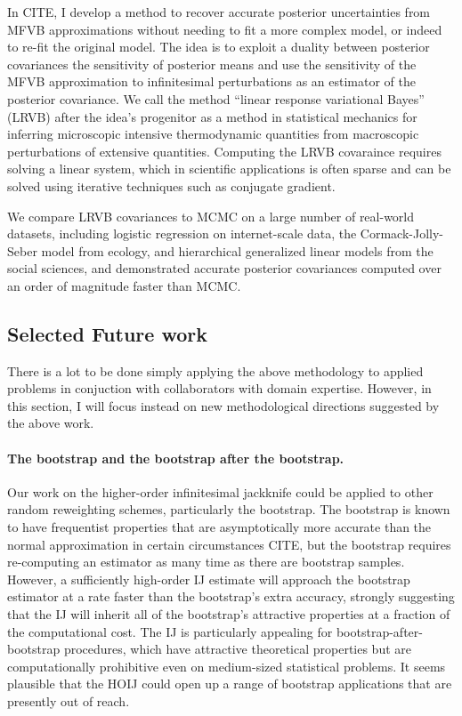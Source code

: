 In CITE, I develop a method to recover accurate posterior uncertainties from
MFVB approximations without needing to fit a more complex model, or indeed to
re-fit the original model.  The idea is to exploit a duality between posterior
covariances the sensitivity of posterior means and use the sensitivity of the
MFVB approximation to infinitesimal perturbations as an estimator of the
posterior covariance.  We call the method ``linear response variational Bayes''
(LRVB) after the idea's progenitor as a method in statistical mechanics for
inferring microscopic intensive thermodynamic quantities from macroscopic
perturbations of extensive quantities.  Computing the LRVB covaraince requires
solving a linear system, which in scientific applications is often sparse and
can be solved using iterative techniques such as conjugate gradient.

We compare LRVB covariances to MCMC on a large number of real-world datasets,
including logistic regression on internet-scale data, the Cormack-Jolly-Seber
model from ecology, and hierarchical generalized linear models from the
social sciences, and demonstrated accurate posterior covariances computed
over an order of magnitude faster than MCMC.


\subsection*{Selected Future work}

There is a lot to be done simply applying the above methodology to
applied problems in conjuction with collaborators with domain expertise.
However, in this section, I will focus instead on new methodological directions
suggested by the above work.

\paragraph{The bootstrap and the bootstrap after the bootstrap.}

Our work on the higher-order infinitesimal jackknife could be applied to other
random reweighting schemes, particularly the bootstrap.  The bootstrap is known
to have frequentist properties that are asymptotically more accurate than the
normal approximation in certain circumstances CITE, but the bootstrap requires
re-computing an estimator as many time as there are bootstrap samples. However,
a sufficiently high-order IJ estimate will approach the bootstrap estimator at a
rate faster than the bootstrap's extra accuracy, strongly suggesting that the IJ
will inherit all of the bootstrap's attractive properties at a fraction of the
computational cost.  The IJ is particularly appealing for
bootstrap-after-bootstrap procedures, which have attractive theoretical
properties but are computationally prohibitive even on medium-sized statistical
problems.  It seems plausible that the HOIJ could open up a range of bootstrap
applications that are presently out of reach.


